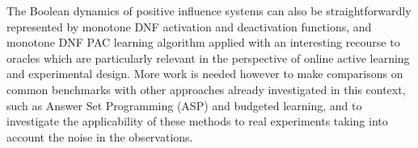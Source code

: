 \documentclass{llncs}
\begin{document}
The Boolean dynamics of positive influence systems can also be straightforwardly represented by monotone DNF activation and deactivation functions,
and monotone DNF PAC learning algorithm applied with an interesting recourse to oracles 
which are particularly relevant in the perspective of online active learning and experimental design.
More work is needed however to make comparisons on common benchmarks
with  other approaches already investigated in this context, such as Answer Set Programming (ASP) and budgeted learning,
and to investigate the applicability of these methods to real experiments taking into account the noise in the observations.



\end{document}
